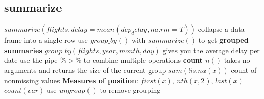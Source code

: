 \documentclass[openany]{book}
\begin{document}
\begin{flushleft}
\section{summarize}
$summarize(flights,delay=mean(dep_delay,na.rm=T))$ \medbreak
collapse a data frame into a single row \medbreak
use $group\_by()$ with $summarize()$ to get \textbf{grouped summaries} \medbreak
$group\_by(flights,year,month,day)$ gives you the average delay per date \medbreak
use the pipe \%$>$\% to combine multiple operations \medbreak
\textbf{count} $n()$ takes no arguments and returns the size of the current group \medbreak
$sum(!is.na(x))$ count of nonmissing values \medbreak
\textbf{Measures of position}: $first(x)$, $nth(x,2)$, $last(x)$ \medbreak
$count(var)$ \medbreak
use $ungroup()$ to remove grouping



\end{flushleft}
\end{document}
